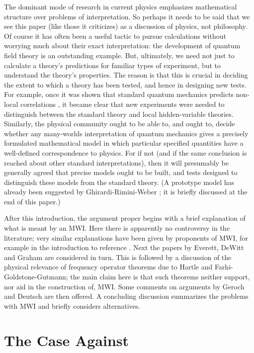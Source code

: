 \documentclass[aps,pra,12pt]{revtex4}
\begin{document}
The dominant mode of research in current physics emphasizes mathematical
structure over problems of interpretation. 
So perhaps it needs to be said that we see this paper (like those it 
criticizes) as a discussion of physics, not philosophy. 
Of course it has often been a useful tactic to pursue calculations without
worrying much about their exact interpretation: the development of quantum
field theory is an outstanding example.
But, ultimately, we need not just to calculate a theory's predictions for 
familiar types of experiment, but to understand the theory's properties. 
The reason is that this is crucial in deciding the 
extent to which a theory has 
been tested, and hence in designing new tests.  
For example, once it was shown that standard quantum mechanics predicts 
non-local correlations \cite{bell0}, it became clear that new experiments
were needed to distinguish between the standard theory and local 
hidden-variable theories. 
Similarly, the physical community ought to be able to, and ought to, 
decide whether any many-worlds interpretation of quantum mechanics gives a 
precisely formulated mathematical model in which particular specified 
quantities have a well-defined correspondence to physics. 
For if not (and if the same conclusion is reached about other standard
interpretations), then it will presumably be generally agreed that 
precise models ought to be built, and tests designed
to distinguish these models from the standard theory. 
(A prototype model has already been 
suggested by Ghirardi-Rimini-Weber \cite{grw}; it is 
briefly discussed at the end of this paper.) 

After this introduction, the argument proper begins with a brief
explanation of what is meant by an MWI.  Here there is apparently no
controversy in the literature; very similar explanations have been
given by proponents of MWI, for example in the introduction to
reference \cite{dew}.  Next the papers by Everett, DeWitt and Graham
are considered in turn.  This is followed by a discussion of the
physical relevance of frequency operator theorems due to Hartle and
Farhi-Goldstone-Gutmann; the main claim here is that such theorems
neither support, nor aid in the construction of, MWI.  Some comments
on arguments by Geroch and Deutsch are then offered.  A concluding
discussion summarizes the problems with MWI and briefly considers
alternatives.

\section{The Case Against}
\end{document}
